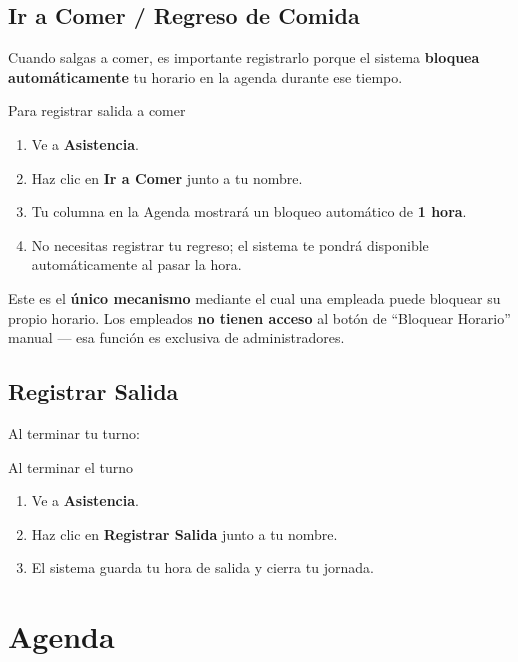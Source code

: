 \documentclass[12pt,a4paper]{article}
\begin{document}
\subsection{Ir a Comer / Regreso de Comida}

Cuando salgas a comer, es importante registrarlo porque el sistema \textbf{bloquea automáticamente} tu horario en la agenda durante ese tiempo.

\begin{pasobox}{Para registrar salida a comer}
\begin{enumerate}[leftmargin=*]
  \item Ve a \textbf{Asistencia}.
  \item Haz clic en \textbf{Ir a Comer} junto a tu nombre.
  \item Tu columna en la Agenda mostrará un bloqueo automático de \textbf{1 hora}.
  \item No necesitas registrar tu regreso; el sistema te pondrá disponible automáticamente al pasar la hora.
\end{enumerate}
\end{pasobox}

\begin{alertabox}
Este es el \textbf{único mecanismo} mediante el cual una empleada puede bloquear su propio horario. Los empleados \textbf{no tienen acceso} al botón de ``Bloquear Horario'' manual --- esa función es exclusiva de administradores.
\end{alertabox}

\subsection{Registrar Salida}

Al terminar tu turno:

\begin{pasobox}{Al terminar el turno}
\begin{enumerate}[leftmargin=*]
  \item Ve a \textbf{Asistencia}.
  \item Haz clic en \textbf{Registrar Salida} junto a tu nombre.
  \item El sistema guarda tu hora de salida y cierra tu jornada.
\end{enumerate}
\end{pasobox}

\newpage
\section{Agenda}
\end{document}
